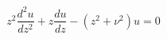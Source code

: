 \documentclass[12pt]{article}
\begin{document}
\begin{displaymath}
z^2\frac{d^2u}{dz^2} + z\frac{du}{dz} - (z^2 + \nu^2)u = 0
\end{displaymath}
\end{document}
